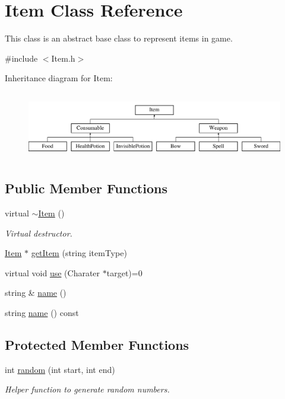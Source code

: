 \hypertarget{classItem}{\section{Item Class Reference}
\label{classItem}
}


This class is an abstract base class to represent items in game.  




{\ttfamily \#include $<$Item.\-h$>$}

Inheritance diagram for Item\-:\begin{figure}[H]
\begin{center}
\leavevmode
\includegraphics[height=3.000000cm]{classItem}
\end{center}
\end{figure}
\subsection*{Public Member Functions}
\begin{DoxyCompactItemize}
\item 
virtual \hyperlink{classItem_a33cc9c0bc556b5a33a9d0d58d37c602b}{$\sim$\-Item} ()
\begin{DoxyCompactList}\small\item\em Virtual destructor. \end{DoxyCompactList}\item 
\hyperlink{classItem}{Item} $\ast$ \hyperlink{classItem_ae2398e06c05c81df420d4ce92cd69a80}{get\-Item} (string item\-Type)
\item 
virtual void \hyperlink{classItem_a6905855bea19d5f5ccc098cf39dc147f}{use} (Charater $\ast$target)=0
\item 
string \& \hyperlink{classItem_aeae73c8d4d4364d62a4984c85d1d2a3b}{name} ()
\item 
string \hyperlink{classItem_aefdaa767e00c0fcfe2801a5e3e4e951d}{name} () const 
\end{DoxyCompactItemize}
\subsection*{Protected Member Functions}
\begin{DoxyCompactItemize}
\item 
int \hyperlink{classItem_ac2b19cad5b3945337b672a4d839938d0}{random} (int start, int end)
\begin{DoxyCompactList}\small\item\em Helper function to generate random numbers. \end{DoxyCompactList}\end{DoxyCompactItemize}
